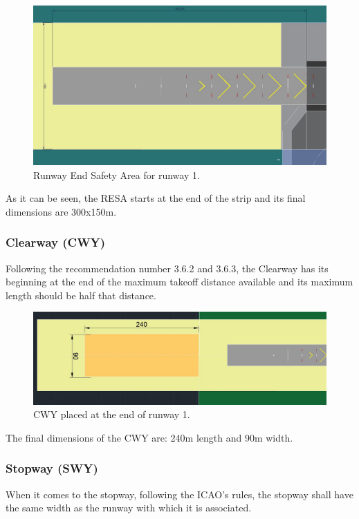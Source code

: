 			\begin{figure}[H]
				\centering
				\includegraphics[clip, trim=0cm 0cm 0cm 0cm, width=1\textwidth]{./images/declareddistances/RESA}
				\caption{Runway End Safety Area for runway 1.} %
				\label{} %
			\end{figure}
		
			As it can be seen, the RESA starts at the end of the strip and its final dimensions are 300x150m. 
			
			\subsubsection{Clearway (CWY)}
			Following the recommendation number 3.6.2 and 3.6.3, the Clearway has its beginning at the end of the maximum takeoff distance available and its maximum length should be half that distance.
			
			\begin{figure}[H]
				\centering
				\includegraphics[clip, trim=0cm 0cm 0cm 0cm, width=1\textwidth]{./images/declareddistances/CWY}
				\caption{CWY placed at the end of runway 1.} %
				\label{} %
			\end{figure}
			
			The final dimensions of the CWY are: 240m length and 90m width. 
			
			\subsubsection{Stopway (SWY)}
			When it comes to the stopway, following the ICAO's rules, the stopway shall have the same width as the runway with which it is associated.

